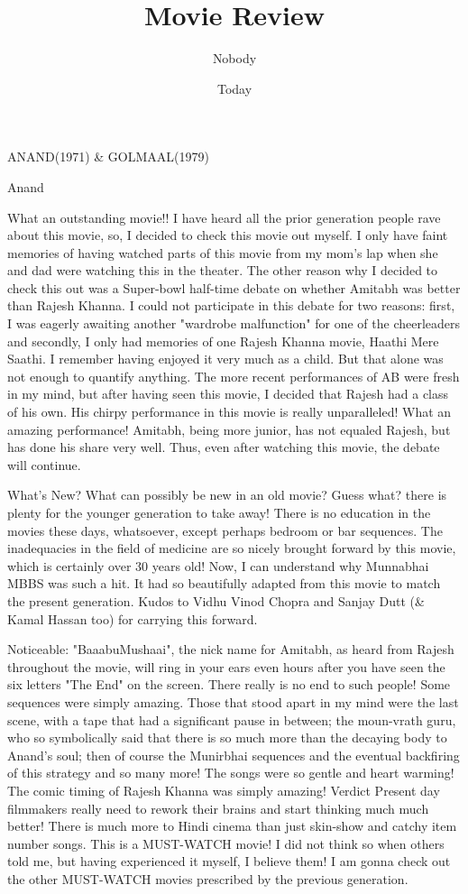 \documentclass{article}
\title{Movie Review}
\author{Nobody}
\date{Today}
\begin{document}
\maketitle

\LARGE{ANAND(1971) \& GOLMAAL(1979)}

\Large{Anand}



What an outstanding movie!! I have heard all the prior generation people rave about this movie, so, I decided to check this movie out myself. I only have faint memories of having watched parts of this movie from my mom's lap when she and dad were watching this in the theater. The other reason why I decided to check this out was a Super-bowl half-time debate on whether Amitabh was better than Rajesh Khanna. I could not participate in this debate for two reasons: first, I was eagerly awaiting another "wardrobe malfunction" for one of the cheerleaders and secondly, I only had memories of one Rajesh Khanna movie, Haathi Mere Saathi. I remember having enjoyed it very much as a child. But that alone was not enough to quantify anything. The more recent performances of AB were fresh in my mind, but after having seen this movie, I decided that Rajesh had a class of his own. His chirpy performance in this movie is really unparalleled! What an amazing performance! Amitabh, being more junior, has not equaled Rajesh, but has done his share very well. Thus, even after watching this movie, the debate will continue.

What's New? What can possibly be new in an old movie? Guess what? there is plenty for the younger generation to take away! There is no education in the movies these days, whatsoever, except perhaps bedroom or bar sequences. The inadequacies in the field of medicine are so nicely brought forward by this movie, which is certainly over 30 years old! Now, I can understand why Munnabhai MBBS was such a hit. It had so beautifully adapted from this movie to match the present generation. Kudos to Vidhu Vinod Chopra and Sanjay Dutt (\& Kamal Hassan too) for carrying this forward.

Noticeable: "BaaabuMushaai",\cite{anand} the nick name for Amitabh, as heard from Rajesh throughout the movie, will ring in your ears even hours after you have seen the six letters "The End" on the screen. There really is no end to such people! Some sequences were simply amazing. Those that stood apart in my mind were the last scene, with a tape that had a significant pause in between; the moun-vrath guru, who so symbolically said that there is so much more than the decaying body to Anand's soul; then of course the Munirbhai sequences and the eventual backfiring of this strategy\cite{anand} and so many more! The songs were so gentle and heart warming! The comic timing of Rajesh Khanna was simply amazing! Verdict Present day filmmakers really need to rework their brains and start thinking much much better! There is much more to Hindi cinema than just skin-show and catchy item number songs. This is a MUST-WATCH movie! I did not think so when others told me, but having experienced it myself, I believe them! I am gonna check out the other MUST-WATCH movies prescribed by the previous generation\cite{movie}. 
\end{document}
